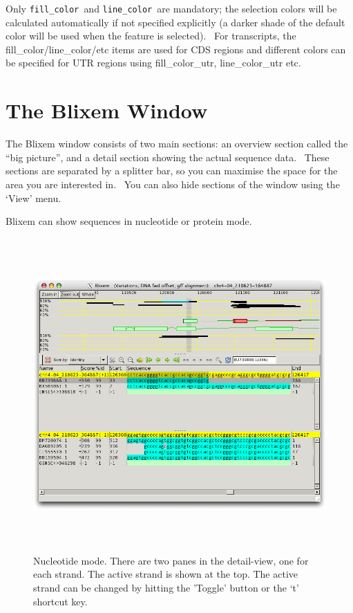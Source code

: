 \documentclass[letterpaper]{article}
\begin{document}
{Only \texttt{fill\_color }and \texttt{line\_color }are mandatory; the
selection colors will be calculated automatically if not specified
explicitly (a darker shade of the default color will be used when the
feature is selected). \ For transcripts, the
fill\_color/line\_color/etc items are used for CDS regions and
different colors can be specified for UTR regions using
fill\_color\_utr, line\_color\_utr etc.}

{\color[rgb]{0.0,0.27058825,0.5254902}\section[The Blixem Window]{The Blixem Window}}
{The Blixem window consists of two main sections: an overview section
called the {\textquotedblleft}big picture{\textquotedblright}, and a
detail section showing the actual sequence data. \ These sections are
separated by a splitter bar, so you can maximise the space for the area
you are interested in. \ You can also hide sections of the window using
the {\textquoteleft}View{\textquoteright} menu.}

\bigskip

{Blixem can show sequences in nucleotide or protein mode.}

\begin{figure}
\centering
\color[rgb]{0.30980393,0.5058824,0.7411765}
\includegraphics[width=15.231cm,height=11.972cm]{img_window_nucleotide_mode.png}
\caption{Nucleotide mode. There are two panes in the detail-view, one for each strand. 
The active strand is shown at the top. The active strand can be changed by hitting 
the {\textquoteright}Toggle{\textquoteright} button or the
 {\textquoteleft}t{\textquoteright} shortcut key.}
\end{figure}
\end{document}
